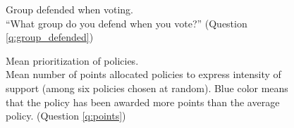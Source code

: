 \begin{figure}[h!]
    \caption[Group defended when voting]{Group defended when voting. \\ ``What group do you defend when you vote?'' (Question \ref{q:group_defended})}\label{fig:group_defended}
\end{figure}


\begin{figure}[h!] 
    \caption[Mean prioritization of policies]{Mean prioritization of policies. \\Mean number of points allocated policies to express intensity of support (among six policies chosen at random). Blue color means that the policy has been awarded more points than the average policy. (Question \ref{q:points})}\label{fig:points}
\end{figure}

